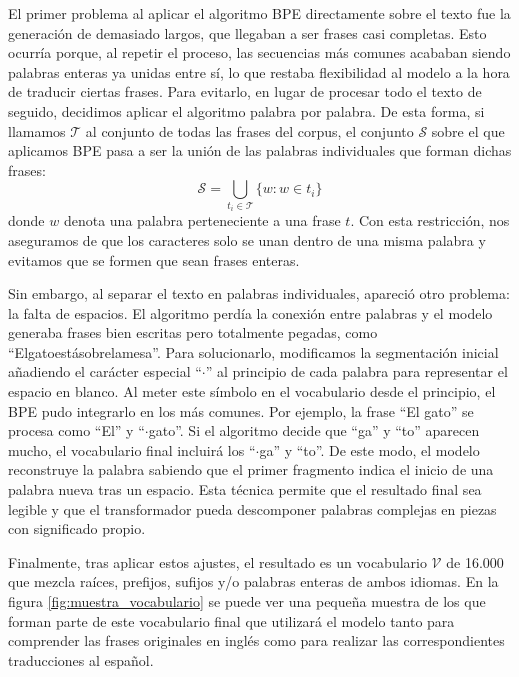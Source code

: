 El primer problema al aplicar el algoritmo BPE directamente sobre el texto fue la generación de \tokens{} demasiado largos, que llegaban a 
ser frases casi completas. Esto ocurría porque, al repetir el proceso, las secuencias más comunes acababan siendo palabras enteras ya unidas 
entre sí, lo que restaba flexibilidad al modelo a la hora de traducir ciertas frases. Para evitarlo, en lugar de procesar
todo el texto de seguido, decidimos aplicar el algoritmo palabra por palabra. De esta forma, si llamamos $\mathcal{T}$ al conjunto de todas las 
frases del corpus, el conjunto $\mathcal{S}$ sobre el que aplicamos BPE pasa a ser la unión de las palabras individuales que forman dichas frases:
\begin{equation}
    \mathcal{S} = \bigcup_{t_i \in \mathcal{T}} \{w : w \in t_i\}
\end{equation}
donde $w$ denota una palabra perteneciente a una frase $t$.
Con esta restricción, nos aseguramos de que los caracteres solo se unan dentro de una misma palabra y  evitamos que se formen \tokens{} 
que sean frases enteras. 

Sin embargo, al separar el texto en palabras individuales, apareció otro problema: la falta de espacios. 
El algoritmo perdía la conexión entre palabras y el modelo generaba frases bien escritas pero totalmente pegadas, como ``Elgatoestásobrelamesa''.
Para solucionarlo, modificamos la segmentación inicial añadiendo el carácter especial ``$\cdot$'' al principio de cada palabra para representar 
el espacio en blanco. Al meter este símbolo en el vocabulario desde el principio, el BPE pudo integrarlo en los \tokens{} más comunes. 
Por ejemplo, la frase ``El gato'' se procesa como ``El'' y ``$\cdot$gato''. Si el algoritmo decide que ``ga'' y ``to'' aparecen mucho, 
el vocabulario final incluirá los \tokens{} ``$\cdot$ga'' y ``to''. De este modo, el modelo reconstruye la palabra sabiendo que el primer 
fragmento indica el inicio de una palabra nueva tras un espacio. Esta técnica permite que el resultado final sea legible y que el transformador pueda 
descomponer palabras complejas en piezas con significado propio.

Finalmente, tras aplicar estos ajustes, el resultado es un vocabulario $\mathcal{V}$ de 16.000 \tokens{} que mezcla raíces, prefijos, sufijos y/o 
palabras enteras de ambos idiomas. 
En la figura \ref{fig:muestra_vocabulario} se puede ver una pequeña muestra de los \tokens{} que forman parte de este vocabulario final que
utilizará el modelo tanto para comprender las frases originales en inglés como para realizar las correspondientes traducciones al español.


